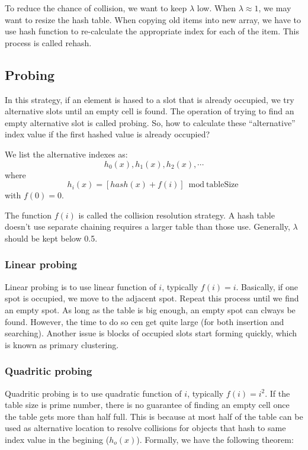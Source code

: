 \documentclass[11pt]{book}
\begin{document}
To reduce the chance of collision, we want to keep \(\lambda\) low. When \(\lambda \approx 1\), we may want to resize the hash table. When copying old items into new array, we have to use hash function to re-calculate the appropriate index for each of the item. This process is called rehash.

\subsection{Probing}
\label{sec:org84681a4}
In this strategy, if an element is hased to a slot that is already occupied, we try alternative slots until an empty cell is found. The operation of trying to find an empty alternative slot is called probing. So, how to calculate these ``alternative'' index value if the first hashed value is already occupied?

We list the alternative indexes as:
\[
h_0(x), h_1(x), h_2(x), \cdots
\]
where
\[
h_i(x) = [hash(x) + f(i)] \bmod \text {tableSize}
\]
with \(f(0) = 0\).

The function \(f(i)\) is called the collision resolution strategy. A hash table doesn't use separate chaining requires a larger table than those use. Generally, \(\lambda\) should be kept below 0.5.

\subsubsection{Linear probing}
\label{sec:org6004f57}
Linear probing is to use linear function of \(i\), typically \(f(i) = i\). Basically, if one spot is occupied, we move to the adjacent spot. Repeat this process until we find an empty spot. As long as the table is big enough, an empty spot can clways be found. However, the time to do so cen get quite large (for both insertion and searching). Another issue is blocks of occupied slots start forming quickly, which is known as primary clustering. 

\subsubsection{Quadritic probing}
\label{sec:org9cd057e}
Quadritic probing is to use quadratic function of \(i\), typically \(f(i) = i^2\). If the table size is prime number, there is no guarantee of finding an empty cell once the table gets more than half full. This is because at most half of the table can be used as alternative location to resolve collisions for objects that hash to same index value in the begining (\(h_o(x)\)). Formally, we have the following theorem:
\end{document}
